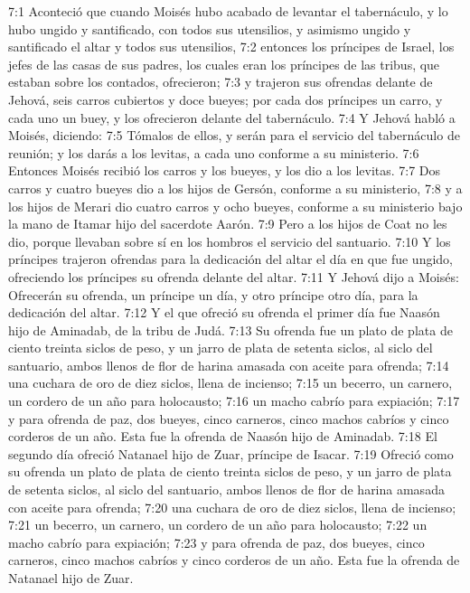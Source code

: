 7:1 Aconteció que cuando Moisés hubo acabado de levantar el tabernáculo, y lo hubo ungido y santificado, con todos sus utensilios, y asimismo ungido y santificado el altar y todos sus utensilios, 
7:2 entonces los príncipes de Israel, los jefes de las casas de sus padres, los cuales eran los príncipes de las tribus, que estaban sobre los contados, ofrecieron;  
7:3 y trajeron sus ofrendas delante de Jehová, seis carros cubiertos y doce bueyes; por cada dos príncipes un carro, y cada uno un buey, y los ofrecieron delante del tabernáculo.  
7:4 Y Jehová habló a Moisés, diciendo:  
7:5 Tómalos de ellos, y serán para el servicio del tabernáculo de reunión; y los darás a los levitas, a cada uno conforme a su ministerio.  
7:6 Entonces Moisés recibió los carros y los bueyes, y los dio a los levitas.  
7:7 Dos carros y cuatro bueyes dio a los hijos de Gersón, conforme a su ministerio,  
7:8 y a los hijos de Merari dio cuatro carros y ocho bueyes, conforme a su ministerio bajo la mano de Itamar hijo del sacerdote Aarón.  
7:9 Pero a los hijos de Coat no les dio, porque llevaban sobre sí en los hombros el servicio del santuario. 
7:10 Y los príncipes trajeron ofrendas para la dedicación del altar el día en que fue ungido, ofreciendo los príncipes su ofrenda delante del altar.  
7:11 Y Jehová dijo a Moisés: Ofrecerán su ofrenda, un príncipe un día, y otro príncipe otro día, para la dedicación del altar.  
7:12 Y el que ofreció su ofrenda el primer día fue Naasón hijo de Aminadab, de la tribu de Judá.  
7:13 Su ofrenda fue un plato de plata de ciento treinta siclos de peso,  y un jarro de plata de setenta siclos, al siclo del santuario, ambos llenos de flor de harina amasada con aceite para ofrenda;  
7:14 una cuchara de oro de diez siclos,  llena de incienso;  
7:15 un becerro, un carnero, un cordero de un año para holocausto;  
7:16 un macho cabrío para expiación;  
7:17 y para ofrenda de paz, dos bueyes, cinco carneros, cinco machos cabríos y cinco corderos de un año. Esta fue la ofrenda de Naasón hijo de Aminadab.  
7:18 El segundo día ofreció Natanael hijo de Zuar, príncipe de Isacar.  
7:19 Ofreció como su ofrenda un plato de plata de ciento treinta siclos de peso,  y un jarro de plata de setenta siclos, al siclo del santuario, ambos llenos de flor de harina amasada con aceite para ofrenda;  
7:20 una cuchara de oro de diez siclos,  llena de incienso;  
7:21 un becerro, un carnero, un cordero de un año para holocausto;  
7:22 un macho cabrío para expiación;  
7:23 y para ofrenda de paz, dos bueyes, cinco carneros, cinco machos cabríos y cinco corderos de un año. Esta fue la ofrenda de Natanael hijo de Zuar.  
